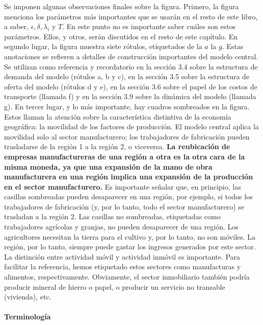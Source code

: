 Se imponen algunas observaciones finales sobre la figura. Primero, la figura menciona los parámetros más importantes que se usarán en el resto de este libro, a saber, $\epsilon, \delta, \lambda_i$ y $T$. En este punto no es importante saber cuáles son estos parámetros. Ellos, y otros, serán discutidos en el resto de este capítulo. En segundo lugar, la figura  muestra siete rótulos, etiquetados de la $a$ la $g$. Estas anotaciones se refieren a detalles de construcción importantes del modelo central. Se utilizan como referencia y recordatorio en la sección 3.4 sobre la estructura de demanda del modelo (rótulos a, b y c), en la sección 3.5 sobre la estructura de oferta del modelo (rótulos d y e), en la sección 3.6 sobre el papel de los costos de transporte (llamada f) y en la sección 3.9 sobre la dinámica del modelo (llamada g). En tercer lugar, y lo más importante, hay cuadros sombreados en la figura. Estos llaman la atención sobre la característica distintiva de la economía geográfica: la movilidad de los factores de producción. El modelo central aplica la movilidad solo al sector manufacturero; los trabajadores de fabricación pueden trasladarse de la región 1 a la región 2, o viceversa. \textbf{La reubicación de empresas manufactureras de una región a otra es la otra cara de la misma moneda, ya que una expansión de la mano de obra manufacturera en una región implica una expansión de la producción en el sector manufacturero.} Es importante señalar que, en principio, las casillas sombreadas pueden desaparecer en una región, por ejemplo, si todos los trabajadores de fabricación (y, por lo tanto, todo el sector manufacturero) se trasladan a la región 2. Las casillas no sombreadas, etiquetadas como trabajadores agrícolas y granjas, no pueden desaparecer de una región. Los agricultores necesitan la tierra para el cultivo y, por lo tanto, no son móviles. La región, por lo tanto, siempre puede gastar los ingresos generados por este sector. La distinción entre actividad móvil y actividad inmóvil es importante. Para facilitar la referencia, hemos etiquetado estos sectores como manufacturas y alimentos, respectivamente. Obviamente, el sector inmobiliario también podría producir mineral de hierro o papel, o producir un servicio no transable (vivienda), etc.\\

\paragraph{Terminología}


